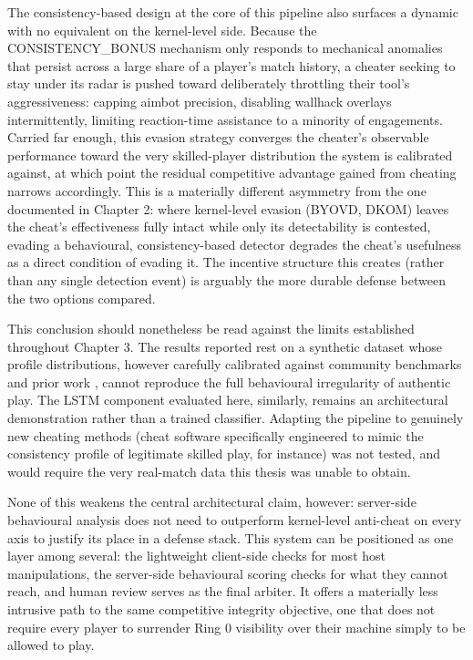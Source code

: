 The consistency-based design at the core of this pipeline also surfaces a dynamic with no equivalent on the kernel-level side. Because the CONSISTENCY\_BONUS mechanism only responds to mechanical anomalies that persist across a large share of a player's match history, a cheater seeking to stay under its radar is pushed toward deliberately throttling their tool's aggressiveness: capping aimbot precision, disabling wallhack overlays intermittently, limiting reaction-time assistance to a minority of engagements. Carried far enough, this evasion strategy converges the cheater's observable performance toward the very skilled-player distribution the system is calibrated against, at which point the residual competitive advantage gained from cheating narrows accordingly. This is a materially different asymmetry from the one documented in Chapter 2: where kernel-level evasion (BYOVD, DKOM) leaves the cheat's effectiveness fully intact while only its detectability is contested, evading a behavioural, consistency-based detector degrades the cheat's usefulness as a direct condition of evading it. The incentive structure this creates (rather than any single detection event) is arguably the more durable defense between the two options compared.

This conclusion should nonetheless be read against the limits established throughout Chapter 3. The results reported rest on a synthetic dataset whose profile distributions, however carefully calibrated against community benchmarks and prior work \cite{Collins2024,Loo2025}, cannot reproduce the full behavioural irregularity of authentic play. The LSTM component evaluated here, similarly, remains an architectural demonstration rather than a trained classifier. Adapting the pipeline to genuinely new cheating methods (cheat software specifically engineered to mimic the consistency profile of legitimate skilled play, for instance) was not tested, and would require the very real-match data this thesis was unable to obtain.

None of this weakens the central architectural claim, however: server-side behavioural analysis does not need to outperform kernel-level anti-cheat on every axis to justify its place in a defense stack. This system can be positioned as one layer among several: the lightweight client-side checks for most host manipulations, the server-side behavioural scoring checks for what they cannot reach, and human review serves as the final arbiter. It offers a materially less intrusive path to the same competitive integrity objective, one that does not require every player to surrender Ring 0 visibility over their machine simply to be allowed to play.
